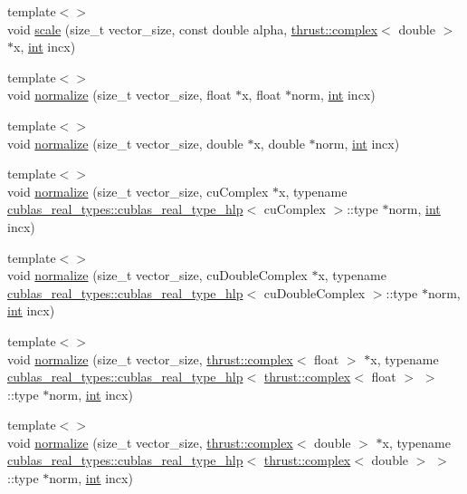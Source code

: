 \begin{DoxyCompactItemize}
\item 
{\footnotesize template$<$$>$ }\\void \hyperlink{classcublas__wrap_a79cf675260b0936988097502a1bdcf99}{scale} (size\-\_\-t vector\-\_\-size, const double alpha, \hyperlink{test__deflation__typedefs_8h_a25cabcac5deb559feab415e2c445d8ba}{thrust\-::complex}$<$ double $>$ $\ast$x, \hyperlink{classint}{int} incx)
\item 
{\footnotesize template$<$$>$ }\\void \hyperlink{classcublas__wrap_a86f3dd4f6085aa743a23ba651265fc17}{normalize} (size\-\_\-t vector\-\_\-size, float $\ast$x, float $\ast$norm, \hyperlink{classint}{int} incx)
\item 
{\footnotesize template$<$$>$ }\\void \hyperlink{classcublas__wrap_a02a1228507b08efa6c382a7cf02cb586}{normalize} (size\-\_\-t vector\-\_\-size, double $\ast$x, double $\ast$norm, \hyperlink{classint}{int} incx)
\item 
{\footnotesize template$<$$>$ }\\void \hyperlink{classcublas__wrap_a6853d431cdcd95420ce8a317ccdff44e}{normalize} (size\-\_\-t vector\-\_\-size, cu\-Complex $\ast$x, typename \hyperlink{structcublas__real__types_1_1cublas__real__type__hlp}{cublas\-\_\-real\-\_\-types\-::cublas\-\_\-real\-\_\-type\-\_\-hlp}$<$ cu\-Complex $>$\-::type $\ast$norm, \hyperlink{classint}{int} incx)
\item 
{\footnotesize template$<$$>$ }\\void \hyperlink{classcublas__wrap_a8636fa09a8e165b6c9a0b58a389a9efc}{normalize} (size\-\_\-t vector\-\_\-size, cu\-Double\-Complex $\ast$x, typename \hyperlink{structcublas__real__types_1_1cublas__real__type__hlp}{cublas\-\_\-real\-\_\-types\-::cublas\-\_\-real\-\_\-type\-\_\-hlp}$<$ cu\-Double\-Complex $>$\-::type $\ast$norm, \hyperlink{classint}{int} incx)
\item 
{\footnotesize template$<$$>$ }\\void \hyperlink{classcublas__wrap_a3a40440b45f866e4e06ad147f0c6dbb4}{normalize} (size\-\_\-t vector\-\_\-size, \hyperlink{test__deflation__typedefs_8h_a25cabcac5deb559feab415e2c445d8ba}{thrust\-::complex}$<$ float $>$ $\ast$x, typename \hyperlink{structcublas__real__types_1_1cublas__real__type__hlp}{cublas\-\_\-real\-\_\-types\-::cublas\-\_\-real\-\_\-type\-\_\-hlp}$<$ \hyperlink{test__deflation__typedefs_8h_a25cabcac5deb559feab415e2c445d8ba}{thrust\-::complex}$<$ float $>$ $>$\-::type $\ast$norm, \hyperlink{classint}{int} incx)
\item 
{\footnotesize template$<$$>$ }\\void \hyperlink{classcublas__wrap_aeb087da44f8db856661fbba9e7a1581c}{normalize} (size\-\_\-t vector\-\_\-size, \hyperlink{test__deflation__typedefs_8h_a25cabcac5deb559feab415e2c445d8ba}{thrust\-::complex}$<$ double $>$ $\ast$x, typename \hyperlink{structcublas__real__types_1_1cublas__real__type__hlp}{cublas\-\_\-real\-\_\-types\-::cublas\-\_\-real\-\_\-type\-\_\-hlp}$<$ \hyperlink{test__deflation__typedefs_8h_a25cabcac5deb559feab415e2c445d8ba}{thrust\-::complex}$<$ double $>$ $>$\-::type $\ast$norm, \hyperlink{classint}{int} incx)
\end{DoxyCompactItemize}


